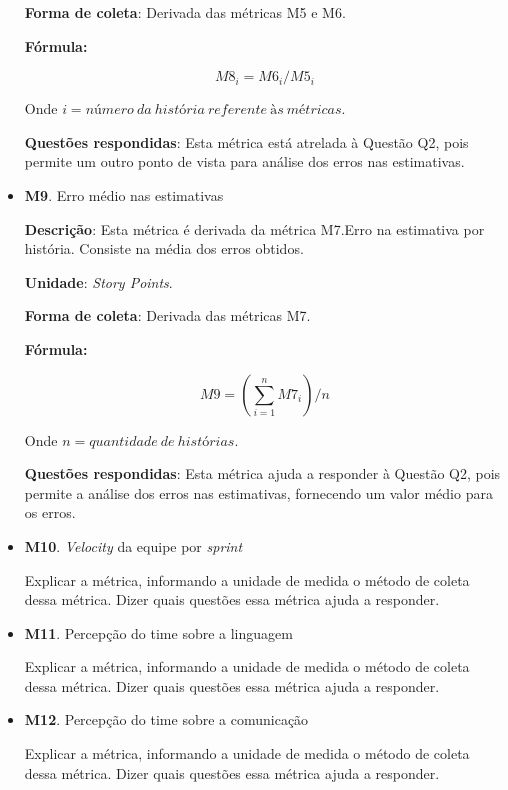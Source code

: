 \begin{itemize}
	   \subitem \textbf{Forma de coleta}: Derivada das métricas M5 e M6.
	   
	      \subsubitem \textbf{Fórmula:} 
	      
		$$ M8_i = M6_i / M5_i $$
		
	      \subsubitem Onde $i = número\ da\ história\ referente\ às\ métricas$.
	   
	   \subitem \textbf{Questões respondidas}: Esta métrica está atrelada à Questão Q2, pois permite um outro ponto de vista
		    para análise dos erros nas estimativas.
	 
	 \item \textbf{M9}. Erro médio nas estimativas
	   
	   \subitem \textbf{Descrição}: Esta métrica é derivada da métrica M7.Erro na estimativa por história.
		    Consiste na média dos erros obtidos.
	   
	   \subitem \textbf{Unidade}: \textit{Story Points}.
	   
	   \subitem \textbf{Forma de coleta}: Derivada das métricas M7.
	   
	      \subsubitem \textbf{Fórmula:} 
	      
		$$ M9 = (\sum\limits_{i=1}^{n}M7_i)/n $$
		
	      \subsubitem Onde $n = quantidade\ de\ histórias$.
	   
	   \subitem \textbf{Questões respondidas}: Esta métrica ajuda a responder à Questão Q2, pois permite a análise 
		    dos erros nas estimativas, fornecendo um valor médio para os erros.
		    
	 \item \textbf{M10}. \textit{Velocity} da equipe por \textit{sprint}
	 
	   \subitem Explicar a métrica, informando a unidade de medida o método de coleta dessa métrica. Dizer quais questões essa
		    métrica ajuda a responder.
	 
	 \item \textbf{M11}. Percepção do time sobre a linguagem
	 
	   \subitem Explicar a métrica, informando a unidade de medida o método de coleta dessa métrica. Dizer quais questões essa
		    métrica ajuda a responder.
	
	 \item \textbf{M12}. Percepção do time sobre a comunicação
	 
	   \subitem Explicar a métrica, informando a unidade de medida o método de coleta dessa métrica. Dizer quais questões essa
		    métrica ajuda a responder.
		    
	\end{itemize}
	
